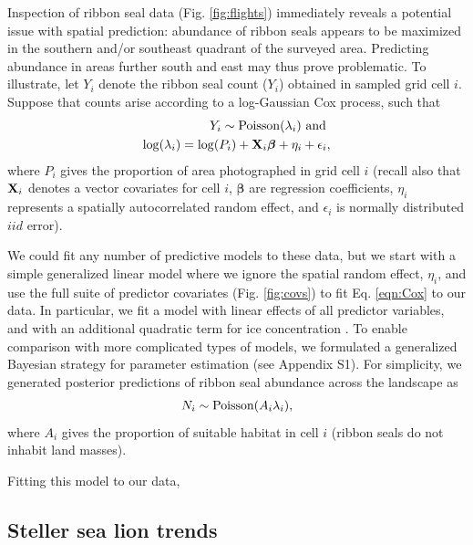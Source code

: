 \documentclass[12pt,english]{article}
\begin{document}
\begin{spacing}{1.9}
Inspection of ribbon seal data (Fig. \ref{fig:flights}) immediately reveals a potential
issue with spatial prediction: abundance of ribbon seals appears to be maximized in the southern and/or southeast quadrant of the surveyed area.  Predicting abundance in areas further south and east may thus prove problematic.  To illustrate, let $Y_i$ denote the ribbon seal count ($Y_i$) obtained in sampled grid cell $i$.  Suppose that counts arise according to a log-Gaussian Cox process, such that
\begin{eqnarray}
  \label{eqn:Cox}
  Y_i \sim {\rm Poisson}(\lambda_i) \mbox{ and } \\
  \log(\lambda_i) = \log(P_i) + {\bf X}_i \boldsymbol{\beta} + \eta_i + \epsilon_i, \nonumber
\end{eqnarray}
where $P_i$ gives the proportion of area photographed in grid cell $i$ (recall also that ${\bf X}_i$ denotes a vector covariates for cell $i$, $\boldsymbol{\beta}$ are regression coefficients, $\eta_i$ represents a spatially autocorrelated random effect, and $\epsilon_i$ is normally distributed $iid$ error).

We could fit any number of predictive models to these data, but we start with a simple
generalized linear model where we ignore the spatial random effect, $\eta_i$, and use the full suite of predictor covariates (Fig. \ref{fig:covs}) to fit Eq. \ref{eqn:Cox} to our data. In particular, we fit a model with linear effects of all predictor variables, and with an additional quadratic term for ice concentration \citep[seal density is often maximized at an intermediate value of ice concentration; see][]{VerHoef2013,ConnEtAl2014}. To enable comparison with more complicated types of models, we formulated a generalized Bayesian strategy for parameter estimation (see Appendix S1).  For simplicity, we generated posterior predictions of ribbon seal abundance across the landscape as
\begin{equation}
  N_i \sim {\rm Poisson}(A_i \lambda_i),
\end{equation}
where $A_i$ gives the proportion of suitable habitat in cell $i$ (ribbon seals do not inhabit land masses).

Fitting this model to our data,





\subsection{Steller sea lion trends}





\end{spacing}
\end{document}

